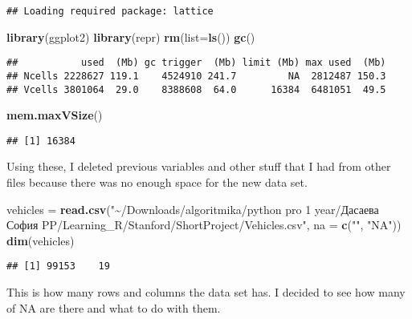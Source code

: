 \documentclass[
]{article}
\newenvironment{Shaded}{\begin{snugshade}}{\end{snugshade}}
\newcommand{\AttributeTok}[1]{\textcolor[rgb]{0.13,0.29,0.53}{#1}}
\newcommand{\FunctionTok}[1]{\textcolor[rgb]{0.13,0.29,0.53}{\textbf{#1}}}
\newcommand{\NormalTok}[1]{#1}
\newcommand{\OtherTok}[1]{\textcolor[rgb]{0.56,0.35,0.01}{#1}}
\newcommand{\StringTok}[1]{\textcolor[rgb]{0.31,0.60,0.02}{#1}}
\begin{document}
\begin{verbatim}
## Loading required package: lattice
\end{verbatim}

\begin{Shaded}
\begin{Highlighting}[]
\FunctionTok{library}\NormalTok{(ggplot2)}
\FunctionTok{library}\NormalTok{(repr) }
\FunctionTok{rm}\NormalTok{(}\AttributeTok{list=}\FunctionTok{ls}\NormalTok{())}
\FunctionTok{gc}\NormalTok{()}
\end{Highlighting}
\end{Shaded}

\begin{verbatim}
##           used  (Mb) gc trigger  (Mb) limit (Mb) max used  (Mb)
## Ncells 2228627 119.1    4524910 241.7         NA  2812487 150.3
## Vcells 3801064  29.0    8388608  64.0      16384  6481051  49.5
\end{verbatim}

\begin{Shaded}
\begin{Highlighting}[]
\FunctionTok{mem.maxVSize}\NormalTok{()}
\end{Highlighting}
\end{Shaded}

\begin{verbatim}
## [1] 16384
\end{verbatim}

Using these, I deleted previous variables and other stuff that I had
from other files because there was no enough space for the new data set.

\begin{Shaded}
\begin{Highlighting}[]
\NormalTok{vehicles }\OtherTok{=} \FunctionTok{read.csv}\NormalTok{(}\StringTok{"\textasciitilde{}/Downloads/algoritmika/python pro 1 year/Дасаева София PP/Learning\_R/Stanford/ShortProject/Vehicles.csv"}\NormalTok{, }\AttributeTok{na =} \FunctionTok{c}\NormalTok{(}\StringTok{""}\NormalTok{, }\StringTok{"NA"}\NormalTok{))}
\FunctionTok{dim}\NormalTok{(vehicles)}
\end{Highlighting}
\end{Shaded}

\begin{verbatim}
## [1] 99153    19
\end{verbatim}

This is how many rows and columns the data set has. I decided to see how
many of NA are there and what to do with them.
\end{document}
